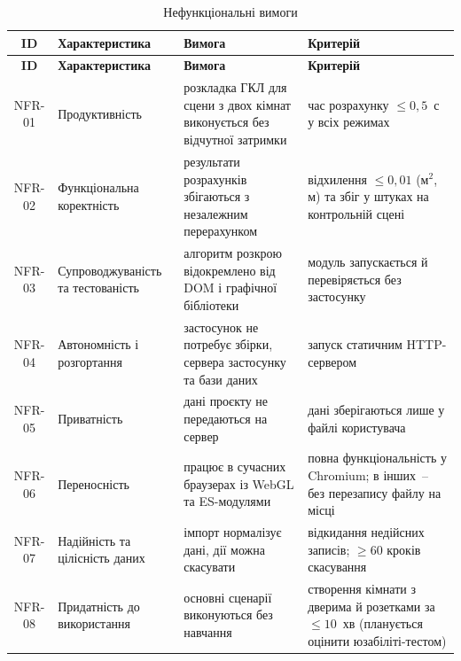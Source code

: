\begin{spacing}{1.15}
\small\noindent
\begin{xltabular}{\textwidth}{| c | >{\raggedright\arraybackslash}p{3.0cm} | >{\raggedright\arraybackslash}X | >{\raggedright\arraybackslash}X |}
    \caption{Нефункціональні вимоги} \label{tab:nfr} \\
    \hline
    \textbf{ID} & \textbf{Характеристика} & \textbf{Вимога} & \textbf{Критерій} \\ \hline
    \endfirsthead

    \hline
    \textbf{ID} & \textbf{Характеристика} & \textbf{Вимога} & \textbf{Критерій} \\ \hline
    \endhead

    NFR-01 & Продуктивність & розкладка ГКЛ для сцени з двох кімнат виконується без відчутної затримки & час розрахунку $\le 0{,}5$~с у всіх режимах \\ \hline
    NFR-02 & Функціональна коректність & результати розрахунків збігаються з незалежним перерахунком & відхилення $\le 0{,}01$ (м$^2$, м) та збіг у штуках на контрольній сцені \\ \hline
    NFR-03 & Супроводжуваність та тестованість & алгоритм розкрою відокремлено від DOM і графічної бібліотеки & модуль запускається й перевіряється без застосунку \\ \hline
    NFR-04 & Автономність і розгортання & застосунок не потребує збірки, сервера застосунку та бази даних & запуск статичним HTTP-сервером \\ \hline
    NFR-05 & Приватність & дані проєкту не передаються на сервер & дані зберігаються лише у файлі користувача \\ \hline
    NFR-06 & Переносність & працює в сучасних браузерах із WebGL та ES-модулями & повна функціональність у Chromium; в інших~-- без перезапису файлу на місці \\ \hline
    NFR-07 & Надійність та цілісність даних & імпорт нормалізує дані, дії можна скасувати & відкидання недійсних записів; $\ge 60$ кроків скасування \\ \hline
    NFR-08 & Придатність до використання & основні сценарії виконуються без навчання & створення кімнати з дверима й розетками за $\le 10$~хв (планується оцінити юзабіліті-тестом) \\ \hline
\end{xltabular}
\end{spacing}


